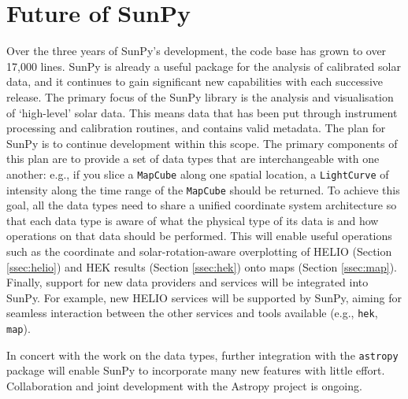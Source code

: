 \section{Future of SunPy}\label{sec:future}

Over the three years of SunPy's development, the code base has grown to over 17,000 lines. 
SunPy is already a 
useful package for the analysis of calibrated solar data, and it
continues to gain significant new capabilities with each successive release.
The primary focus of the 
SunPy library is the analysis and visualisation of `high-level' solar 
data. This means data that has been put through instrument processing 
and 
calibration routines, and contains valid metadata. 
The plan for SunPy is to continue development within this 
scope. The 
primary components of this plan are to provide a set of data types 
that are 
interchangeable with one another: e.g., if you slice a 
\texttt{MapCube} 
along one spatial location, a \texttt{LightCurve} of intensity along the 
time range of 
the \texttt{MapCube} should be returned. To achieve this goal, all the 
data 
types need to share a unified coordinate system architecture so that 
each data 
type is aware of what the physical type of its data is and how 
operations on 
that data should be performed. This will enable useful operations
such as the coordinate and solar-rotation-aware 
overplotting of HELIO (Section \ref{ssec:helio}) and HEK
results (Section \ref{ssec:hek}) onto maps (Section \ref{ssec:map}).
Finally, support for new data providers and services will be integrated into SunPy.
For example, new HELIO services will be supported by SunPy, aiming for
seamless interaction between the other services and tools available (e.g., 
\texttt{hek}, \texttt{map}).  

In concert with the work on the data types, further integration with 
the 
\texttt{astropy} package will enable SunPy to incorporate many new features
with little effort. Collaboration and joint development with the 
Astropy project \citep{theastropycollaboration2013} is ongoing.